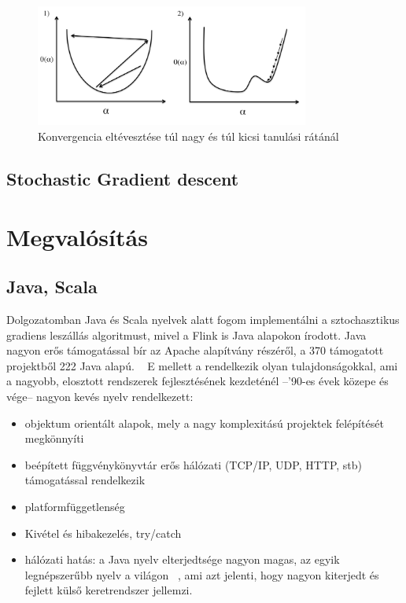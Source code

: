 \documentclass[a4paper,12pt]{article}
\begin{document}
\begin{figure}[ht!]
\centering
\includegraphics[width=90mm]{img/alfa.png}
\caption{Konvergencia eltévesztése túl nagy és túl kicsi tanulási rátánál \label{alfa}}
\end{figure}

\subsection{Stochastic Gradient descent}


\section{Megvalósítás}

\subsection{Java, Scala}
Dolgozatomban Java és Scala nyelvek alatt fogom implementálni a sztochasztikus gradiens leszállás algoritmust, mivel a Flink is Java alapokon írodott. Java nagyon erős támogatással bír az Apache alapítvány részéről, a 370 támogatott projektből 222 Java alapú. ~\cite{asf} E mellett a rendelkezik olyan tulajdonságokkal, ami a nagyobb, elosztott rendszerek fejlesztésének kezdeténél --'90-es évek közepe és vége-- nagyon kevés nyelv rendelkezett:
\begin{itemize}
\item objektum orientált alapok, mely a nagy komplexitású projektek felépítését megkönnyíti
\item beépített függvénykönyvtár erős hálózati (TCP/IP, UDP, HTTP, stb) támogatással rendelkezik
\item platformfüggetlenség
\item Kivétel és hibakezelés, try/catch
\item hálózati hatás: a Java nyelv elterjedtsége nagyon magas, az egyik legnépszerűbb nyelv a világon ~\cite{tiobe}, ami azt jelenti, hogy nagyon kiterjedt és fejlett külső keretrendszer jellemzi.
\end{itemize}
\end{document}
